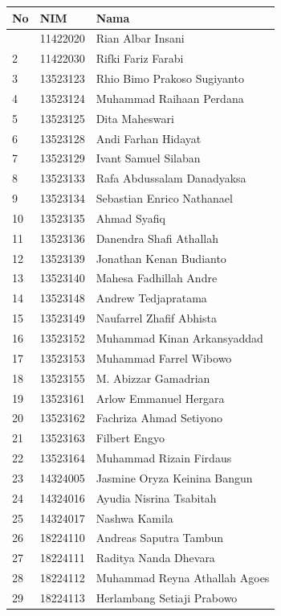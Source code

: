 \documentclass[
  letterpaper,
  DIV=11,
  numbers=noendperiod]{scrreprt}
\begin{document}

\begin{longtable}[]{@{}lll@{}}
\toprule\noalign{}
No & NIM & Nama \\
\midrule\noalign{}
\endhead
\bottomrule\noalign{}
\endlastfoot
1 & 11422020 & Rian Albar Insani \\
2 & 11422030 & Rifki Fariz Farabi \\
3 & 13523123 & Rhio Bimo Prakoso Sugiyanto \\
4 & 13523124 & Muhammad Raihaan Perdana \\
5 & 13523125 & Dita Maheswari \\
6 & 13523128 & Andi Farhan Hidayat \\
7 & 13523129 & Ivant Samuel Silaban \\
8 & 13523133 & Rafa Abdussalam Danadyaksa \\
9 & 13523134 & Sebastian Enrico Nathanael \\
10 & 13523135 & Ahmad Syafiq \\
11 & 13523136 & Danendra Shafi Athallah \\
12 & 13523139 & Jonathan Kenan Budianto \\
13 & 13523140 & Mahesa Fadhillah Andre \\
14 & 13523148 & Andrew Tedjapratama \\
15 & 13523149 & Naufarrel Zhafif Abhista \\
16 & 13523152 & Muhammad Kinan Arkansyaddad \\
17 & 13523153 & Muhammad Farrel Wibowo \\
18 & 13523155 & M. Abizzar Gamadrian \\
19 & 13523161 & Arlow Emmanuel Hergara \\
20 & 13523162 & Fachriza Ahmad Setiyono \\
21 & 13523163 & Filbert Engyo \\
22 & 13523164 & Muhammad Rizain Firdaus \\
23 & 14324005 & Jasmine Oryza Keinina Bangun \\
24 & 14324016 & Ayudia Nisrina Tsabitah \\
25 & 14324017 & Nashwa Kamila \\
26 & 18224110 & Andreas Saputra Tambun \\
27 & 18224111 & Raditya Nanda Dhevara \\
28 & 18224112 & Muhammad Reyna Athallah Agoes \\
29 & 18224113 & Herlambang Setiaji Prabowo \\

\end{longtable}
\end{document}
